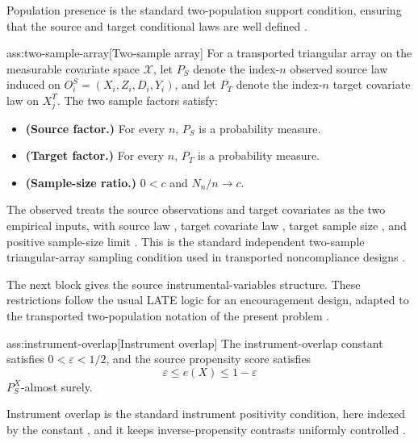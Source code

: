 Population presence is the standard two-population support condition, ensuring that the source and target conditional laws are well defined \citep{ChenHuang2025}.

\begin{assumptionv}{ass:two-sample-array}[Two-sample array]
For a transported triangular array on the measurable covariate space \(\mathcal X\), let \(P_S\) denote the index-\(n\) observed source law induced on \(O_i^S=(X_i,Z_i,D_i,Y_i)\), and let \(P_T\) denote the index-\(n\) target covariate law on \(X_j^T\). The two sample factors satisfy:
\begin{itemize}
\item \textbf{(Source factor.)} For every \(n\), \(P_S\) is a probability measure.
\item \textbf{(Target factor.)} For every \(n\), \(P_T\) is a probability measure.
\item \textbf{(Sample-size ratio.)} \(0<c\) and \(N_n/n\to c\).
\end{itemize}
\end{assumptionv}

The observed  treats the source observations  and target covariates  as the two empirical inputs, with source law , target covariate law , target sample size , and positive sample-size limit .  This is the standard independent two-sample triangular-array sampling condition used in transported noncompliance designs \citep{ChenHuang2025}.

The next block gives the source instrumental-variables structure.  These restrictions follow the usual LATE logic for an encouragement design, adapted to the transported two-population notation of the present problem \citep{ImbensAngrist1994,AngristImbensRubin1996}.

\begin{assumptionv}{ass:instrument-overlap}[Instrument overlap]
The instrument-overlap constant satisfies \(0<\varepsilon<1/2\), and the source propensity score satisfies
\[
\varepsilon\le e(X)\le 1-\varepsilon
\]
\(P_S^X\)-almost surely.
\end{assumptionv}

Instrument overlap is the standard instrument positivity condition, here indexed by the constant , and it keeps inverse-propensity contrasts uniformly controlled \citep{ChenHuang2025}.

